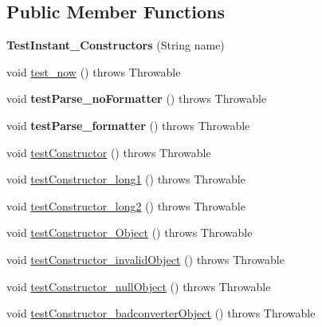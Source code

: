 \subsection*{Public Member Functions}
\begin{DoxyCompactItemize}
\item 
\hypertarget{classorg_1_1joda_1_1time_1_1_test_instant___constructors_a3892cbae481ab88b4df9121e2d865db7}{{\bfseries Test\-Instant\-\_\-\-Constructors} (String name)}\label{classorg_1_1joda_1_1time_1_1_test_instant___constructors_a3892cbae481ab88b4df9121e2d865db7}

\item 
void \hyperlink{classorg_1_1joda_1_1time_1_1_test_instant___constructors_a16ccb309f3d3a3c3a219fb4eea6d7023}{test\-\_\-now} ()  throws Throwable 
\item 
\hypertarget{classorg_1_1joda_1_1time_1_1_test_instant___constructors_a0553ce28e28570ee54fc150b22b12120}{void {\bfseries test\-Parse\-\_\-no\-Formatter} ()  throws Throwable }\label{classorg_1_1joda_1_1time_1_1_test_instant___constructors_a0553ce28e28570ee54fc150b22b12120}

\item 
\hypertarget{classorg_1_1joda_1_1time_1_1_test_instant___constructors_a3f8cb8e327023a92f31b4ca6b60f8ef0}{void {\bfseries test\-Parse\-\_\-formatter} ()  throws Throwable }\label{classorg_1_1joda_1_1time_1_1_test_instant___constructors_a3f8cb8e327023a92f31b4ca6b60f8ef0}

\item 
void \hyperlink{classorg_1_1joda_1_1time_1_1_test_instant___constructors_a7470b31f0ef07cd439240cbd48d16e8a}{test\-Constructor} ()  throws Throwable 
\item 
void \hyperlink{classorg_1_1joda_1_1time_1_1_test_instant___constructors_a0caa612673bee0513e84a407b18c08a6}{test\-Constructor\-\_\-long1} ()  throws Throwable 
\item 
void \hyperlink{classorg_1_1joda_1_1time_1_1_test_instant___constructors_a5bb503878e3fa61ee45be2b09d7c26eb}{test\-Constructor\-\_\-long2} ()  throws Throwable 
\item 
void \hyperlink{classorg_1_1joda_1_1time_1_1_test_instant___constructors_aa909f2a8736e4ea6d7fb6548776b3d49}{test\-Constructor\-\_\-\-Object} ()  throws Throwable 
\item 
void \hyperlink{classorg_1_1joda_1_1time_1_1_test_instant___constructors_a7768afdff5f27934e9d764a327c36575}{test\-Constructor\-\_\-invalid\-Object} ()  throws Throwable 
\item 
void \hyperlink{classorg_1_1joda_1_1time_1_1_test_instant___constructors_a7dddf019c31d22bfeb4aaf9e5fed7e0a}{test\-Constructor\-\_\-null\-Object} ()  throws Throwable 
\item 
void \hyperlink{classorg_1_1joda_1_1time_1_1_test_instant___constructors_a1eaac0149330684cd0a998cf176539e2}{test\-Constructor\-\_\-badconverter\-Object} ()  throws Throwable 
\end{DoxyCompactItemize}

